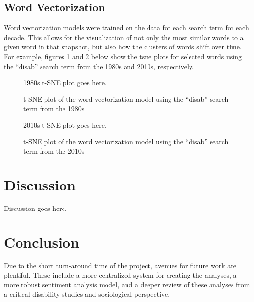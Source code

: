 \documentclass[11pt,a4paper]{article}
\begin{document}
\subsection{Word Vectorization}
Word vectorization models were trained on the data for each search term for each decade. This allows for the visualization of not only the most similar words to a given word in that snapshot, but also how the clusters of words shift over time. For example, figures \ref{1980tsne} and \ref{2010tsne} below show the tsne plots for selected words using the ``disab'' search term from the 1980s and 2010s, respectively.

\begin{figure}[h]
\centering
1980s t-SNE plot goes here.
\caption{t-SNE plot of the word vectorization model using the ``disab'' search term from the 1980s.} \label{1980tsne}
\end{figure}

\begin{figure}[h]
\centering
2010s t-SNE plot goes here.
\caption{t-SNE plot of the word vectorization model using the ``disab'' search term from the 2010s.} \label{2010tsne}
\end{figure}

\section{Discussion}
Discussion goes here.

\section{Conclusion}
Due to the short turn-around time of the project, avenues for future work are plentiful. These include a more centralized system for creating the analyses, a more robust sentiment analysis model, and a deeper review of these analyses from a critical disability studies and sociological perspective.
\end{document}
